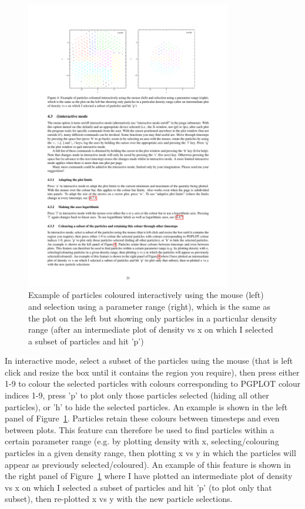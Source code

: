 \documentclass[a4paper,10pt]{article}
\begin{document}
\begin{figure}
\centering
\includegraphics[width=0.8\textwidth]{colourparts.pdf}
\caption{Example of particles coloured interactively using the mouse (left) and selection using a parameter range (right), which is the same as the plot on the left but showing only particles in a particular density range (after an intermediate plot of density vs x on which I selected a subset of particles and hit 'p')}
\label{fig:colourparts}
\end{figure}

 In interactive mode, select a subset of the particles using the mouse (that is left click and resize the box until it contains the region you require), then press either 1-9 to colour the selected particles with colours corresponding to PGPLOT colour indices 1-9, press 'p' to plot only those particles selected (hiding all other particles), or 'h' to hide the selected particles. An example is shown in the left panel of Figure~\ref{fig:colourparts}.  Particles retain these colours between timesteps and even between plots. This feature can therefore be used to find particles within a certain parameter range (e.g. by plotting density with x, selecting/colouring particles in a given density range, then plotting x vs y in which the particles will appear as previously selected/coloured). An example of this feature is shown in the right panel of Figure~\ref{fig:colourparts} where I have plotted an intermediate plot of density vs x on which I selected a subset of particles and hit 'p' (to plot only that subset), then re-plotted x vs y with the new particle selections.
 
\end{document}
